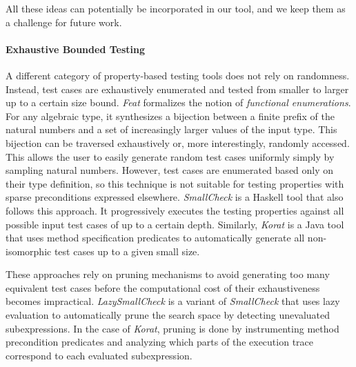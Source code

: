 \documentclass[sigconf,review,anonymous]{acmart}
\begin{document}
%
All these ideas can potentially be incorporated in our tool, and we keep them as
a challenge for future work.


\paragraph{Exhaustive Bounded Testing}

A different category of property-based testing tools does not rely on
randomness.
%
Instead, test cases are exhaustively enumerated and tested from smaller to
larger up to a certain size bound.
%
%
%
\emph{Feat} \cite{DuregardJW12} formalizes the notion of \emph{functional
  enumerations}.
%
For any algebraic type, it synthesizes a bijection between a finite prefix of
the natural numbers and a set of increasingly larger values of the input type.
%
This bijection can be traversed exhaustively or, more interestingly, randomly
accessed.
%
This allows the user to easily generate random test cases uniformly simply by
sampling natural numbers.
%
However, test cases are enumerated based only on their type definition, so this
technique is not suitable for testing properties with sparse preconditions
expressed elsewhere.
%
\emph{SmallCheck} \cite{runciman2008smallcheck} is a Haskell tool that also
follows this approach.
%
It progressively executes the testing properties against all possible input test
cases of up to a certain depth.
%
Similarly, \emph{Korat} \cite{boyapati2002korat} is a Java tool that uses method
specification predicates to automatically generate all non-isomorphic test cases
up to a given small size.


These approaches rely on pruning mechanisms to avoid generating too many
equivalent test cases before the computational cost of their exhaustiveness
becomes impractical.
%
\emph{LazySmallCheck} is a variant of \emph{SmallCheck} that uses lazy
evaluation to automatically prune the search space by detecting unevaluated
subexpressions.
%
In the case of \emph{Korat}, pruning is done by instrumenting method
precondition predicates and analyzing which parts of the execution trace
correspond to each evaluated subexpression.
\end{document}
